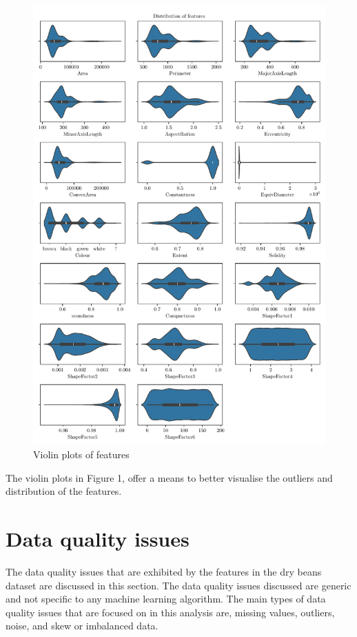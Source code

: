 \documentclass[conference]{IEEEtran}
\begin{document}
\begin{figure}
    \centering
    \includegraphics[scale=0.8]{test.pdf}
    \caption{Violin plots of features}
\end{figure}

The violin plots in Figure 1, offer a means to better visualise the outliers and distribution of the features.

\section{Data quality issues}
The data quality issues that are exhibited by the features in the dry beans dataset are discussed in this section.
The data quality issues discussed are generic and not specific to any machine learning algorithm. The main
types of data quality issues that are focused on in this analysis are, missing values, outliers, noise, and skew or imbalanced data.
\end{document}
